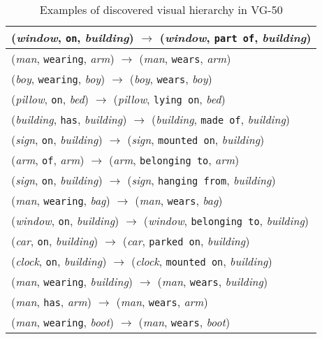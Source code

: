 \documentclass[runningheads]{llncs}
\begin{document}
{
\begin{longtable}{ l }
\caption{Examples of discovered visual hierarchy in VG-50}
\label{table:vg50_vis_h}\\
\hline
(\textit{window}, \texttt{on}, \textit{building}) $\rightarrow$ (\textit{window}, \texttt{part of}, \textit{building}) \\ \hline
(\textit{man}, \texttt{wearing}, \textit{arm}) $\rightarrow$ (\textit{man}, \texttt{wears}, \textit{arm}) \\ \hline
(\textit{boy}, \texttt{wearing}, \textit{boy}) $\rightarrow$ (\textit{boy}, \texttt{wears}, \textit{boy}) \\ \hline
(\textit{pillow}, \texttt{on}, \textit{bed}) $\rightarrow$ (\textit{pillow}, \texttt{lying on}, \textit{bed}) \\ \hline
(\textit{building}, \texttt{has}, \textit{building}) $\rightarrow$ (\textit{building}, \texttt{made of}, \textit{building}) \\ \hline
(\textit{sign}, \texttt{on}, \textit{building}) $\rightarrow$ (\textit{sign}, \texttt{mounted on}, \textit{building}) \\ \hline
(\textit{arm}, \texttt{of}, \textit{arm}) $\rightarrow$ (\textit{arm}, \texttt{belonging to}, \textit{arm}) \\ \hline
(\textit{sign}, \texttt{on}, \textit{building}) $\rightarrow$ (\textit{sign}, \texttt{hanging from}, \textit{building}) \\ \hline
(\textit{man}, \texttt{wearing}, \textit{bag}) $\rightarrow$ (\textit{man}, \texttt{wears}, \textit{bag}) \\ \hline
(\textit{window}, \texttt{on}, \textit{building}) $\rightarrow$ (\textit{window}, \texttt{belonging to}, \textit{building}) \\ \hline
(\textit{car}, \texttt{on}, \textit{building}) $\rightarrow$ (\textit{car}, \texttt{parked on}, \textit{building}) \\ \hline
(\textit{clock}, \texttt{on}, \textit{building}) $\rightarrow$ (\textit{clock}, \texttt{mounted on}, \textit{building}) \\ \hline
(\textit{man}, \texttt{wearing}, \textit{building}) $\rightarrow$ (\textit{man}, \texttt{wears}, \textit{building}) \\ \hline
(\textit{man}, \texttt{has}, \textit{arm}) $\rightarrow$ (\textit{man}, \texttt{wears}, \textit{arm}) \\ \hline
(\textit{man}, \texttt{wearing}, \textit{boot}) $\rightarrow$ (\textit{man}, \texttt{wears}, \textit{boot}) \\ \hline

\end{longtable}}
\end{document}
